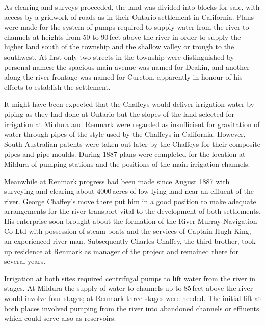 As clearing and surveys proceeded, the land was divided into blocks
for sale, with access by a gridwork of roads as in their Ontario
settlement in California.  Plans were made for the system of pumps
required to supply water from the river to channels at heights from 50
to 90\,feet above the river in order to supply the higher land south
of the township and the shallow valley or trough to the southwest.  At
first only two streets in the township were distinguished by personal
names: the spacious main avenue was named for Deakin, and another
along the river frontage was named for Cureton, apparently in honour
of his efforts to establish the settlement.

It might have been expected that the Chaffeys would deliver irrigation
water by piping as they had done at Ontario but the slopes of the land
selected for irrigation at Mildura and Renmark were regarded as
insufficient for gravitation of water through pipes of the style used
by the Chaffeys in California.  However, South Australian patents were
taken out later by the Chaffeys for their composite pipes and pipe
moulds.  During 1887 plans were completed for the location at Mildura
of pumping stations and the positions of the main irrigation
channels.

Meanwhile at Renmark progress had been made since August 1887 with
surveying and clearing about 4000\,acres of low-lying land near an
effluent of the river.  George Chaffey's move there put him in a good
position to make adequate arrangements for the river transport vital
to the development of both settlements.  His enterprise soon brought
about the formation of the River Murray Navigation Co Ltd with
possession of steam-boats and the services of Captain Hugh King,
 an experienced river-man. 
Subsequently Charles Chaffey,  the third brother,
took up residence at Renmark as manager of the project and remained
there for several years.

Irrigation at both sites required centrifugal pumps
 to lift water from
the river in stages.  At Mildura the supply of water to channels up to
85\,feet above the river would involve four stages; at Renmark three
stages were needed.  The initial lift at both places involved pumping
from the river into abandoned channels or effluents which could serve
also as reservoirs.

